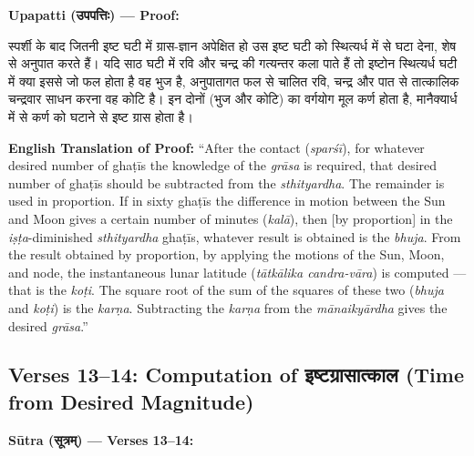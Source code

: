 \documentclass[11pt,a4paper]{article}
\newcommand{\dev}[1]{{\devanagarifont #1}}
\newenvironment{sanskritverse}{%
  \begin{center}\begin{minipage}{0.95\textwidth}
  \setlength{\leftskip}{1em}
  \setlength{\rightskip}{1em}
  \dev
}{\end{minipage}\end{center}}
\newenvironment{paracol}[1]{\begingroup}{\endgroup}
\newcommand{\switchcolumn}[1][]{%
  \ifnum#1=0\relax\else\par\nobreak\vspace{0.5em}\par\nobreak\fi%
}
\begin{document}
\vspace{0.5em}

\begin{paracol}{2}

\noindent\textbf{Upapatti (\dev{उपपत्तिः}) — Proof:}
\begin{sanskritverse}
स्पर्शी के बाद जितनी इष्ट घटी में ग्रास-ज्ञान अपेक्षित हो उस इष्ट घटी को स्थित्यर्ध में से घटा
देना, शेष से अनुपात करते हैं। यदि साठ घटी में रवि और चन्द्र की गत्यन्तर कला पाते हैं तो
इष्टोन स्थित्यर्ध घटी में क्या इससे जो फल होता है वह भुज है, अनुपातागत फल से चालित रवि,
चन्द्र और पात से तात्कालिक चन्द्रवार साधन करना वह कोटि है। इन दोनों (भुज और कोटि)
का वर्गयोग मूल कर्ण होता है, मानैक्यार्ध में से कर्ण को घटाने से इष्ट ग्रास होता है।
\end{sanskritverse}

\switchcolumn

\textbf{English Translation of Proof:} ``After the contact (\textit{sparśī}), for whatever desired number of ghaṭīs the knowledge of the \textit{grāsa} is required, that desired number of ghaṭīs should be subtracted from the \textit{sthityardha}. The remainder is used in proportion. If in sixty ghaṭīs the difference in motion between the Sun and Moon gives a certain number of minutes (\textit{kalā}), then [by proportion] in the \textit{iṣṭa}-diminished \textit{sthityardha} ghaṭīs, whatever result is obtained is the \textit{bhuja}. From the result obtained by proportion, by applying the motions of the Sun, Moon, and node, the instantaneous lunar latitude (\textit{tātkālika candra-vāra}) is computed --- that is the \textit{koṭi}. The square root of the sum of the squares of these two (\textit{bhuja} and \textit{koṭi}) is the \textit{karṇa}. Subtracting the \textit{karṇa} from the \textit{mānaikyārdha} gives the desired \textit{grāsa}.''

\end{paracol}

\subsection{Verses 13--14: Computation of \texorpdfstring{{\devanagarifont इष्टग्रासात्काल}}{iṣṭagrāsāt-kāla} (Time from Desired Magnitude)}

\vspace{0.5em}
\noindent\textbf{Sūtra (\dev{सूत्रम्}) — Verses 13--14:}
\end{document}

